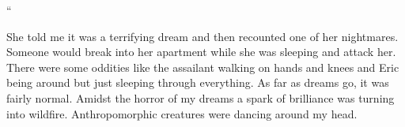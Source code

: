 \begin{adjustwidth}{2em}{2em}
\noindent\Huge``\normalsize
\begin{adjustwidth}{1em}{1em}

\end{adjustwidth}
\end{adjustwidth}
\VV


\noindent
She told me it was a terrifying dream and then recounted one of
her nightmares.  Someone would break into her apartment while she
was sleeping and attack her.  There were some oddities like
the assailant walking on hands and knees and Eric being around
but just sleeping through everything.  As far as dreams go,
it was fairly normal.
\lhoarb
\noindent
Amidst the horror of my dreams a spark of brilliance was turning into wildfire.
Anthropomorphic creatures were dancing around my head.
\vspace*{3ex}


\begin{adjustwidth}{3em}{3em}

\end{adjustwidth}

